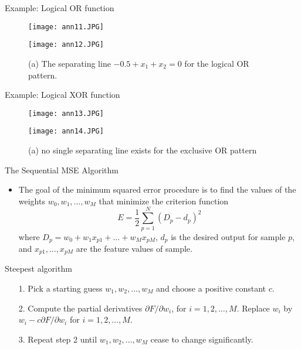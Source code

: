 \begin{frame}{Example: Logical OR function}
\begin{figure}
\texttt{[image: ann11.JPG]}
\end{figure}
\begin{figure}
\texttt{[image: ann12.JPG]}
\caption{(a) The separating line $-0.5+x_1+x_2=0$ for the logical OR pattern.}
\end{figure}
\end{frame}

\begin{frame}{Example: Logical XOR function}
\begin{figure}
\texttt{[image: ann13.JPG]}
\end{figure}
\begin{figure}
\texttt{[image: ann14.JPG]}
\caption{(a) no single separating line exists for the exclusive OR pattern}
\end{figure}
\end{frame}

\begin{frame}{The Sequential MSE Algorithm}
\begin{itemize}
\item The goal of the minimum squared error procedure is to find the values of the weights $w_0,w_1,\ldots,w_M$ that minimize the criterion function
\begin{equation}
E = \frac{1}{2}\sum\limits_{p = 1}^N {{{({D_p} - {d_p})}^2}} \nonumber
\end{equation}
where
$D_p=w_0+w_1x_{p1}+\ldots+w_Mx_{pM}$, $d_p$ is the desired output for sample $p$, and $x_{p1},\ldots,x_{pM}$ are the feature values of sample.
\end{itemize}
\end{frame}

\begin{frame}{Steepest algorithm}
\begin{itemize}
\item[1.] Pick a starting guess $w_1,w_2,\ldots,w_M$ and choose a positive constant $c$.
\item[2.] Compute the partial derivatives $\partial F/\partial w_i$, for $i=1,2,\ldots,M$. Replace $w_i$ by $w_i-c\partial F/\partial w_i$ for $i=1,2,\ldots,M$.
\item[3.] Repeat step 2 until $w_1,w_2,\ldots,w_M$ cease to change significantly.
\end{itemize}
\end{frame}

